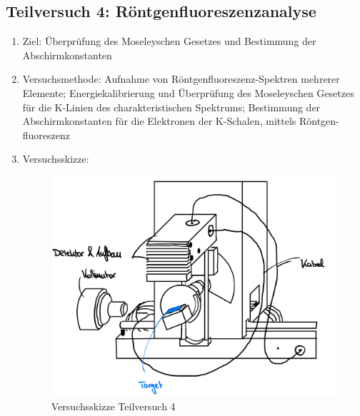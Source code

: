 \documentclass{article}
\begin{document}
\subsection{Teilversuch 4: Röntgenfluoreszenzanalyse}
\begin{enumerate}[label = (\Roman*)]
    \item Ziel: Überprüfung des Moseleyschen Gesetzes und Bestimmung der Abschirmkonstanten
    
    \item Versuchsmethode: Aufnahme von Röntgenfluoreszenz-Spektren mehrerer Elemente; Energiekalibrierung und Überprüfung des Moseleyschen Gesetzes für die K-Linien des charakteristischen Spektrums; Bestimmung der Abschirmkonstanten für die Elektronen der K-Schalen, mittels Röntgen- fluoreszenz
    
    \item Versuchsskizze:
    
        \begin{figure}[H]
        \centering
        \includegraphics[width=0.7\linewidth]{Abbildungen/Aufbau Fluoreszenz.jpeg}
        \caption{Versuchsskizze Teilversuch 4}
        \end{figure}


\end{enumerate}
\end{document}
